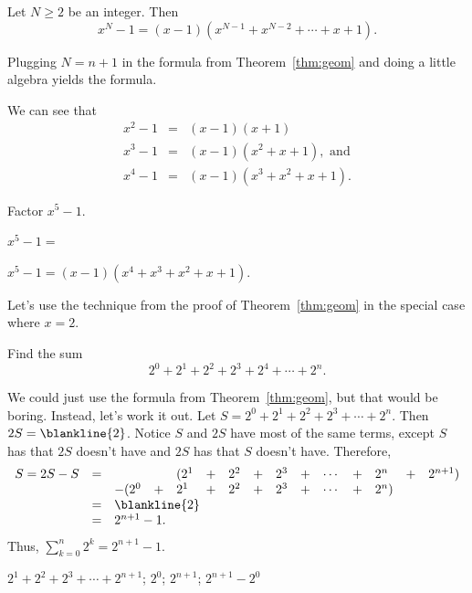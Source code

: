 \begin{cor}
Let $N\geq 2$ be an integer.  Then 
$$x^N-1 = (x-1)(x^{N-1}+x^{N-2}+\cdots + x +1).$$
\begin{pf}
Plugging $N=n+1$ in the formula from Theorem~\ref{thm:geom} and doing a little algebra
yields the formula.
\end{pf}
\end{cor}

\newpage %
\begin{exa}
We can see that
\begin{eqnarray*}
x^2-1&=&(x-1)(x+1)\\
x^3-1&=&(x-1)(x^2+x+1), \mbox{ and}\\
x^4-1&=&(x-1)(x^3+x^2+x+1).
\end{eqnarray*}
\end{exa}

\begin{exer}
Factor $x^5-1$.

\noindent
$x^5-1=$
\begin{answer}
$x^5-1=(x-1)(x^4+x^3+x^2+x+1)$.
\end{answer}
\end{exer}


Let's use the technique from the proof of Theorem~\ref{thm:geom} in the special case where $x=2$.

\begin{fib}
Find the sum $$2^0+2^1 + 2^2 + 2^3 + 2^4 + \cdots + 2^n.$$
 \begin{sol}   
We could just use the formula from Theorem~\ref{thm:geom}, but that would be boring.
Instead, let's work it out. 
Let $S = 2^0+2^1 + 2^2 + 2^3 + \cdots + 2^{n}.$
Then $2S=\blankline{2}$.  Notice $S$ and $2S$ have most of the same terms,
except $S$ has  that $2S$ doesn't have and 
$2S$ has  that $S$ doesn't have.
Therefore,
$$
\begin{array}{lllllllllllllll}
S = 2S - S &= &   &   & (2^1 & + & 2^2 & + & 2^3 & + & \cdots & + & 2^{n}  & + & 2^{n+1})\\
   &  &-( 2^0 & + & 2^1 & + & 2^2 & + & 2^3 & + & \cdots & + & 2^{n} ) &   &  \\
&=&\multicolumn{8}{l}{\blankline{2}}\\
&=&\multicolumn{8}{l}{2^{n+1}-1.}\\
\end{array}
$$
Thus, 
$\displaystyle\sum_{k=0}^n 2^k = 2^{n+1}-1.$
\end{sol}
\begin{answer}
$2^1+2^2 + 2^3  + \cdots + 2^{n+1}$;
$2^0$; 
$2^{n+1}$;
$2^{n+1}-2^0$
\end{answer}
\end{fib}

